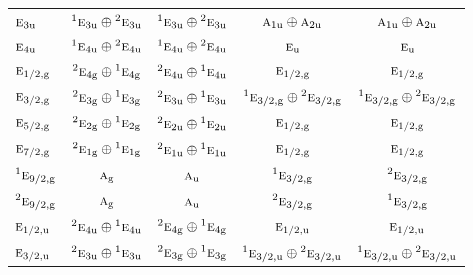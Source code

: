 \documentclass[10pt,a4paper]{article}
\numberwithin{equation}{section}
\newcommand{\irr}[1]{\text{\normalfont\scshape #1}}
\newcommand{\conjpair}[1]{{}^{#1}}
\newcommand{\ptag}[1]{\mathrm{#1}}
\begin{document}
{\begin{longtable}{@{}lcccc@{}}
$\irr{e}_{3\ptag{u}}$ & $\conjpair{1}\irr{e}_{3\ptag{u}}\oplus \conjpair{2}\irr{e}_{3\ptag{u}}$ & $\conjpair{1}\irr{e}_{3\ptag{u}}\oplus \conjpair{2}\irr{e}_{3\ptag{u}}$ & $\irr{a}_{1\ptag{u}}\oplus \irr{a}_{2\ptag{u}}$ & $\irr{a}_{1\ptag{u}}\oplus \irr{a}_{2\ptag{u}}$\\
$\irr{e}_{4\ptag{u}}$ & $\conjpair{1}\irr{e}_{4\ptag{u}}\oplus \conjpair{2}\irr{e}_{4\ptag{u}}$ & $\conjpair{1}\irr{e}_{4\ptag{u}}\oplus \conjpair{2}\irr{e}_{4\ptag{u}}$ & $\irr{e}_{\ptag{u}}$ & $\irr{e}_{\ptag{u}}$\\
$\irr{e}_{1/2,\ptag{g}}$ & $\conjpair{2}\irr{e}_{4\ptag{g}}\oplus \conjpair{1}\irr{e}_{4\ptag{g}}$ & $\conjpair{2}\irr{e}_{4\ptag{u}}\oplus \conjpair{1}\irr{e}_{4\ptag{u}}$ & $\irr{e}_{1/2,\ptag{g}}$ & $\irr{e}_{1/2,\ptag{g}}$\\
$\irr{e}_{3/2,\ptag{g}}$ & $\conjpair{2}\irr{e}_{3\ptag{g}}\oplus \conjpair{1}\irr{e}_{3\ptag{g}}$ & $\conjpair{2}\irr{e}_{3\ptag{u}}\oplus \conjpair{1}\irr{e}_{3\ptag{u}}$ & $\conjpair{1}\irr{e}_{3/2,\ptag{g}}\oplus \conjpair{2}\irr{e}_{3/2,\ptag{g}}$ & $\conjpair{1}\irr{e}_{3/2,\ptag{g}}\oplus \conjpair{2}\irr{e}_{3/2,\ptag{g}}$\\
$\irr{e}_{5/2,\ptag{g}}$ & $\conjpair{2}\irr{e}_{2\ptag{g}}\oplus \conjpair{1}\irr{e}_{2\ptag{g}}$ & $\conjpair{2}\irr{e}_{2\ptag{u}}\oplus \conjpair{1}\irr{e}_{2\ptag{u}}$ & $\irr{e}_{1/2,\ptag{g}}$ & $\irr{e}_{1/2,\ptag{g}}$\\
$\irr{e}_{7/2,\ptag{g}}$ & $\conjpair{2}\irr{e}_{1\ptag{g}}\oplus \conjpair{1}\irr{e}_{1\ptag{g}}$ & $\conjpair{2}\irr{e}_{1\ptag{u}}\oplus \conjpair{1}\irr{e}_{1\ptag{u}}$ & $\irr{e}_{1/2,\ptag{g}}$ & $\irr{e}_{1/2,\ptag{g}}$\\
$\conjpair{1}\irr{e}_{9/2,\ptag{g}}$ & $\irr{a}_{\ptag{g}}$ & $\irr{a}_{\ptag{u}}$ & $\conjpair{1}\irr{e}_{3/2,\ptag{g}}$ & $\conjpair{2}\irr{e}_{3/2,\ptag{g}}$\\
$\conjpair{2}\irr{e}_{9/2,\ptag{g}}$ & $\irr{a}_{\ptag{g}}$ & $\irr{a}_{\ptag{u}}$ & $\conjpair{2}\irr{e}_{3/2,\ptag{g}}$ & $\conjpair{1}\irr{e}_{3/2,\ptag{g}}$\\
$\irr{e}_{1/2,\ptag{u}}$ & $\conjpair{2}\irr{e}_{4\ptag{u}}\oplus \conjpair{1}\irr{e}_{4\ptag{u}}$ & $\conjpair{2}\irr{e}_{4\ptag{g}}\oplus \conjpair{1}\irr{e}_{4\ptag{g}}$ & $\irr{e}_{1/2,\ptag{u}}$ & $\irr{e}_{1/2,\ptag{u}}$\\
$\irr{e}_{3/2,\ptag{u}}$ & $\conjpair{2}\irr{e}_{3\ptag{u}}\oplus \conjpair{1}\irr{e}_{3\ptag{u}}$ & $\conjpair{2}\irr{e}_{3\ptag{g}}\oplus \conjpair{1}\irr{e}_{3\ptag{g}}$ & $\conjpair{1}\irr{e}_{3/2,\ptag{u}}\oplus \conjpair{2}\irr{e}_{3/2,\ptag{u}}$ & $\conjpair{1}\irr{e}_{3/2,\ptag{u}}\oplus \conjpair{2}\irr{e}_{3/2,\ptag{u}}$\\

\end{longtable}}
\end{document}
